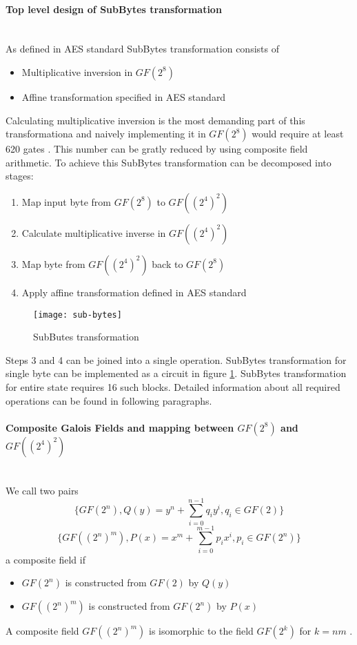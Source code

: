 \paragraph{Top level design of SubBytes transformation}\mbox{}\\
As defined in AES standard \cite{aes-standard} SubBytes transformation consists of
\begin{itemize}[nolistsep]
\item Multiplicative inversion in $GF(2^8)$
\item Affine transformation specified in AES standard \cite{aes-standard}
\end{itemize}
Calculating multiplicative inversion is the most demanding part of this transformationa and naively implementing it in $GF(2^8)$ would require at least 620 gates \cite{vlsi}. This number can be gratly reduced by using composite field arithmetic. To achieve this SubBytes transformation can be decomposed into stages:
\begin{enumerate}[nolistsep]
\item Map input byte from $GF(2^8)$ to $GF((2^4)^2)$ 
\item Calculate multiplicative inverse in $GF((2^4)^2)$
\item Map byte from $GF((2^4)^2)$ back to $GF(2^8)$
\item Apply affine transformation defined in AES standard \cite{aes-standard}
\end{enumerate}

\begin{figure}[!h]
\centering
\texttt{[image: sub-bytes]}
\caption{SubButes transformation}
\label{fig:sub-single-byte}
\end{figure}

Steps 3 and 4 can be joined into a single operation. SubBytes transformation for single byte can be implemented as a circuit in figure \ref{fig:sub-single-byte}. SubBytes transformation for entire state requires 16 such blocks. Detailed information about all required operations can be found in following paragraphs.




\paragraph{Composite Galois Fields and mapping between $GF(2^8)$ and $GF((2^4)^2)$}\mbox{}\\
We call two pairs
\begin{equation*}
\{GF(2^n), Q(y) = y^n + \sum_{i=0}^{n-1} q_i y^i, q_i \in GF(2) \}
\end{equation*}
\begin{equation*}
\{GF((2^n)^m), P(x) = x^m + \sum_{i=0}^{m-1} p_i x^i, p_i \in GF(2^n) \}
\end{equation*}
a composite field \cite{vlsi} if 
\begin{itemize}[nolistsep]
\item $GF(2^n)$ is constructed from $GF(2)$ by $Q(y)$
\item $GF((2^n)^m)$ is constructed from $GF(2^n)$ by $P(x)$
\end{itemize}
A composite field $GF((2^n)^m)$ is isomorphic to the field $GF(2^k)$ for $k = nm$ \cite{vlsi}.

